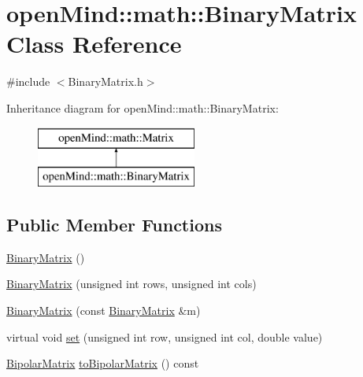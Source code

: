 \hypertarget{classopen_mind_1_1math_1_1_binary_matrix}{\section{open\+Mind\+:\+:math\+:\+:Binary\+Matrix Class Reference}
\label{classopen_mind_1_1math_1_1_binary_matrix}
}


{\ttfamily \#include $<$Binary\+Matrix.\+h$>$}

Inheritance diagram for open\+Mind\+:\+:math\+:\+:Binary\+Matrix\+:\begin{figure}[H]
\begin{center}
\leavevmode
\includegraphics[height=2.000000cm]{classopen_mind_1_1math_1_1_binary_matrix}
\end{center}
\end{figure}
\subsection*{Public Member Functions}
\begin{DoxyCompactItemize}
\item 
\hyperlink{classopen_mind_1_1math_1_1_binary_matrix_a4f8319dbc9de02e47bf12b3ee0d0042f}{Binary\+Matrix} ()
\item 
\hyperlink{classopen_mind_1_1math_1_1_binary_matrix_ac09e135a31b77774711b9c44233e0f76}{Binary\+Matrix} (unsigned int rows, unsigned int cols)
\item 
\hyperlink{classopen_mind_1_1math_1_1_binary_matrix_a68c553282418b76e1705529d6f5cc3a3}{Binary\+Matrix} (const \hyperlink{classopen_mind_1_1math_1_1_binary_matrix}{Binary\+Matrix} \&m)
\item 
virtual void \hyperlink{classopen_mind_1_1math_1_1_binary_matrix_a89e70c9b644961bf6ba9aee4091878f8}{set} (unsigned int row, unsigned int col, double value)
\item 
\hyperlink{classopen_mind_1_1math_1_1_bipolar_matrix}{Bipolar\+Matrix} \hyperlink{classopen_mind_1_1math_1_1_binary_matrix_a7ced7aaf9d53c99909ea5bae9580a054}{to\+Bipolar\+Matrix} () const 
\end{DoxyCompactItemize}
